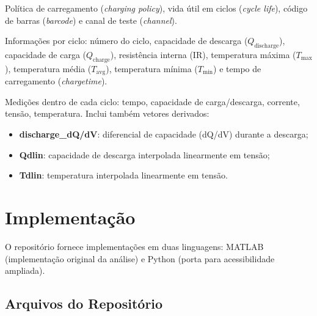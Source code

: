 \documentclass[12pt,a4paper]{article}
\begin{document}
\begin{description}[leftmargin=2cm, style=nextline]
  \item[Descritores (\textit{Descriptors})]
    Pol\'{i}tica de carregamento (\textit{charging policy}), vida \'{u}til em ciclos
    (\textit{cycle life}), c\'{o}digo de barras (\textit{barcode}) e canal de teste
    (\textit{channel}).

  \item[Dados de Resumo (\textit{Summary})]
    Informa\c{c}\~oes por ciclo: n\'{u}mero do ciclo, capacidade de descarga
    ($Q_\text{discharge}$), capacidade de carga ($Q_\text{charge}$), resist\^{e}ncia
    interna (IR), temperatura m\'{a}xima ($T_\text{max}$), temperatura m\'{e}dia
    ($T_\text{avg}$), temperatura m\'{i}nima ($T_\text{min}$) e tempo de carregamento
    (\textit{chargetime}).

  \item[Dados de Ciclo (\textit{Cycle})]
    Medi\c{c}\~oes dentro de cada ciclo: tempo, capacidade de carga/descarga, corrente,
    tens\~ao, temperatura. Inclui tamb\'{e}m vetores derivados:
    \begin{itemize}
      \item \textbf{discharge\_dQ/dV}: diferencial de capacidade (dQ/dV) durante
        a descarga;
      \item \textbf{Qdlin}: capacidade de descarga interpolada linearmente em
        tens\~ao;
      \item \textbf{Tdlin}: temperatura interpolada linearmente em tens\~ao.
    \end{itemize}
\end{description}

\section{Implementa\c{c}\~ao}

O reposit\'{o}rio fornece implementa\c{c}\~oes em duas linguagens: MATLAB (implementa\c{c}\~ao
original da an\'{a}lise) e Python (porta para acessibilidade ampliada).

\subsection{Arquivos do Reposit\'{o}rio}
\end{document}
